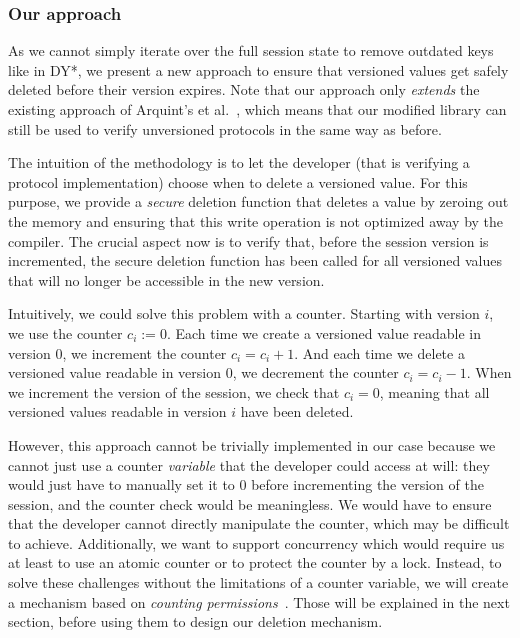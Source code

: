 \subsubsection{Our approach}
\label{sec:our-approach}

As we cannot simply iterate over the full session state to remove outdated keys like in DY*, we present a new approach to ensure that versioned values get safely deleted before their version expires.
Note that our approach only \emph{extends} the existing approach of Arquint's et al.~\cite{ArquintSchwerhoffMehtaMueller23}, which means that our modified library can still be used to verify unversioned protocols in the same way as before.

The intuition of the methodology is to let the developer (that is verifying a protocol implementation) choose when to delete a versioned value.
For this purpose, we provide a \emph{secure} deletion function that deletes a value by zeroing out the memory and ensuring that this write operation is not optimized away by the compiler.
The crucial aspect now is to verify that, before the session version is incremented, the secure deletion function has been called for all versioned values that will no longer be accessible in the new version.

Intuitively, we could solve this problem with a counter. Starting with version $i$, we use the counter $c_i:=0$.
Each time we create a versioned value readable in version $0$, we increment the counter $c_i = c_i + 1$.
And each time we delete a versioned value readable in version $0$, we decrement the counter $c_i = c_i - 1$.
When we increment the version of the session, we check that $c_i = 0$, meaning that all versioned values readable in version $i$ have been deleted.

However, this approach cannot be trivially implemented in our case because we cannot just use a counter \emph{variable} that the developer could access at will: they would just have to manually set it to $0$ before incrementing the version of the session, and the counter check would be meaningless.
We would have to ensure that the developer cannot directly manipulate the counter, which may be difficult to achieve.
Additionally, we want to support concurrency which would require us at least to use an atomic counter or to protect the counter by a lock.
Instead, to solve these challenges without the limitations of a counter variable, we will create a mechanism based on \emph{counting permissions}~\cite{roshardt2021extending}. Those will be explained in the next section, before using them to design our deletion mechanism.

